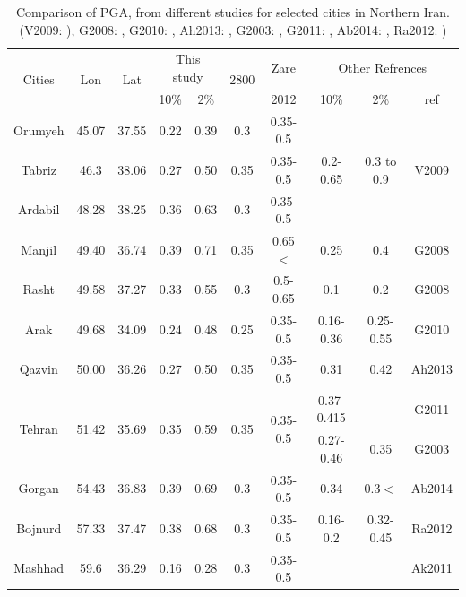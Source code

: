 \documentclass{article}
\begin{document}
\begin{table}[h]
\centering
\caption{Comparison of PGA, from different studies for selected cities in Northern Iran. (V2009:  \citet{vafaie2011}), G2008: \citet{Ghodrati2008}, G2010: \citet{Ghodrati2010},  Ah2013: \citet{Ahmadi2013}, G2003:  \citet{Ghodrati2003}, G2011: \citet{Ghodrati2011}, Ab2014: \citet{Abdollahzadeh2014} , Ra2012: \citet{Rahgozar2012}) }
\begin{tabular}{ | c | c | c | c | c | c | c | c | c | c |}


\hline

	
	\multirow{2}{*}{Cities} & \multirow{2}{*}{Lon} & \multirow{2}{*}{Lat} & \multicolumn{2}{|c|}{This study} & \multirow{2}{*}{2800} & Zare & \multicolumn{3}{|c|}{Other Refrences}    \\ 
	\cline{4-5}  \cline{8-10}  &  &  & 10\% & 2\% &  &  2012 & 10\% & 2\% & ref \\ \hline
	Orumyeh & 45.07 & 37.55 & 0.22 & 0.39 & 0.3 & 0.35-0.5 &  &  &  \\ \hline
	Tabriz      & 46.3     & 38.06 & 0.27& 0.50 & 0.35 & 0.35-0.5 & 0.2- 0.65 & 0.3 to 0.9 & V2009 \\ \hline
	Ardabil    & 48.28 & 38.25 & 0.36 & 0.63 & 0.3 & 0.35-0.5 &  &  &  \\ \hline
	Manjil     & 49.40 & 36.74 & 0.39 & 0.71 & 0.35 & 0.65 $<$ & 0.25 & 0.4 & G2008 \\ \hline
	Rasht     & 49.58 & 37.27 & 0.33 & 0.55 & 0.3 & 0.5-0.65 & 0.1 & 0.2 & G2008 \\ \hline 
	Arak       & 49.68 & 34.09 & 0.24 & 0.48 & 0.25 & 0.35-0.5 & 0.16-0.36 & 0.25-0.55 & G2010 \\ \hline
	Qazvin   & 50.00 & 36.26 & 0.27 & 0.50 & 0.35 & 0.35-0.5 & 0.31 & 0.42 & Ah2013 \\ \hline
	 \multirow{2}{*}{Tehran}  & \multirow{2}{*}{51.42} & \multirow{2}{*}{35.69} & \multirow{2}{*}{0.35} & \multirow{2}{*}{0.59} & \multirow{2}{*}{0.35} & \multirow{2}{*}{0.35-0.5} & 0.37-0.415 &  &  G2011 \\ 
	 \cline{8-10}	             &  &  &  &  &  &  & 0.27-0.46 & 0.35 & G2003\\ \hline
	Gorgan & 54.43 & 36.83 & 0.39 & 0.69 & 0.3 & 0.35-0.5 & 0.34 & 0.3$<$ & Ab2014\\ \hline
	Bojnurd & 57.33 & 37.47 & 0.38 & 0.68 & 0.3 & 0.35-0.5 &0.16-0.2  & 0.32-0.45  & Ra2012  \\ \hline
	Mashhad & 59.6 & 36.29 & 0.16 & 0.28 & 0.3 & 0.35-0.5 &  &  & Ak2011 \\ \hline

\end{tabular}

\end{table}
\end{document}

